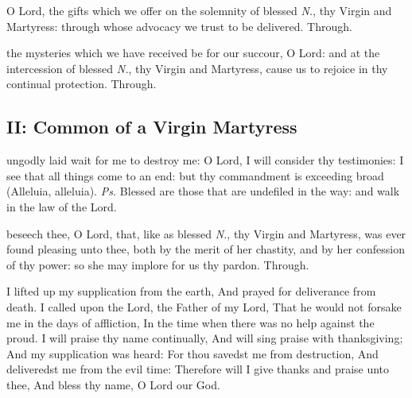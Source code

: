 
\secret
{} O Lord, the gifts which we offer on the solemnity of blessed \textit{N.}, thy Virgin and Martyress: through whose advocacy we trust to be delivered. Through.


\postcommunion
{} the mysteries which we have received be for our succour, O Lord: and at the intercession of blessed \textit{N.}, thy Virgin and Martyress, cause us to rejoice in thy continual protection. Through.


\subsection{II: Common of a Virgin Martyress}\label{CommonVirginMartyrII}

\introit
{} ungodly laid wait for me to destroy me: O Lord, I will consider thy testimonies: I see that all things come to an end: but thy commandment is exceeding broad (Alleluia, alleluia). \textit{Ps.} Blessed are those that are undefiled in the way: and walk in the law of the Lord.

\collect
{} beseech thee, O Lord, that, like as blessed \textit{N.}, thy Virgin and Martyress, was ever found pleasing unto thee, both by the merit of her chastity, and by her confession of thy power: so she may implore for us thy pardon. Through.

 I lifted up my supplication from the earth, And prayed for deliverance from death. I called upon the Lord, the Father of my Lord, That he would not forsake me in the days of affliction, In the time when there was no help against the proud. I will praise thy name continually, And will sing praise with thanksgiving; And my supplication was heard: For thou savedst me from destruction, And deliveredst me from the evil time: Therefore will I give thanks and praise unto thee, And bless thy name, O Lord our God.


